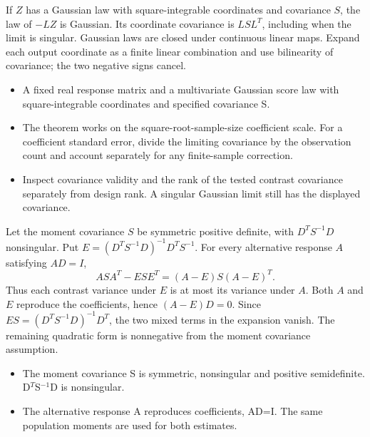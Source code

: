 \expandafter\def\csname statadic@statement@STATADIC-GMM-008\endcsname{If $Z$ has a Gaussian law with square-integrable coordinates
  and covariance $S$, the law of $-LZ$ is Gaussian. Its coordinate covariance
  is $LSL^T$, including when the limit is singular.}
\expandafter\def\csname statadic@proof@STATADIC-GMM-008\endcsname{Gaussian laws are closed under continuous linear maps.
  Expand each output coordinate as a finite linear combination and use bilinearity
  of covariance; the two negative signs cancel.}
\expandafter\def\csname statadic@assumptions@STATADIC-GMM-008\endcsname{\begin{itemize}
\item A fixed real response matrix and a multivariate Gaussian score law with square-integrable coordinates and specified covariance S.
\end{itemize}}
\expandafter\def\csname statadic@diagnostics@STATADIC-GMM-008\endcsname{\begin{itemize}
\item The theorem works on the square-root-sample-size coefficient scale. For a coefficient standard error, divide the limiting covariance by the observation count and account separately for any finite-sample correction.
\item Inspect covariance validity and the rank of the tested contrast covariance separately from design rank. A singular Gaussian limit still has the displayed covariance.
\end{itemize}}
\expandafter\def\csname statadic@statement@STATADIC-GMM-009\endcsname{Let the moment covariance $S$ be symmetric positive definite,
  with $D^T S^{-1}D$ nonsingular. Put $E=(D^T S^{-1}D)^{-1}D^TS^{-1}$.
  For every alternative response $A$ satisfying $AD=I$,
  \[
    ASA^T-ESE^T=(A-E)S(A-E)^T .
  \]
  Thus each contrast variance under $E$ is at most its variance under $A$.}
\expandafter\def\csname statadic@proof@STATADIC-GMM-009\endcsname{Both $A$ and $E$ reproduce the coefficients, hence
  $(A-E)D=0$. Since $ES=(D^TS^{-1}D)^{-1}D^T$, the two mixed terms
  in the expansion vanish. The remaining quadratic form is nonnegative
  from the moment covariance assumption.}
\expandafter\def\csname statadic@assumptions@STATADIC-GMM-009\endcsname{\begin{itemize}
\item The moment covariance S is symmetric, nonsingular and positive semidefinite. D\ensuremath{{}^T}S\ensuremath{{}^{-1}}D is nonsingular.
\item The alternative response A reproduces coefficients, AD=I. The same population moments are used for both estimates.
\end{itemize}}
